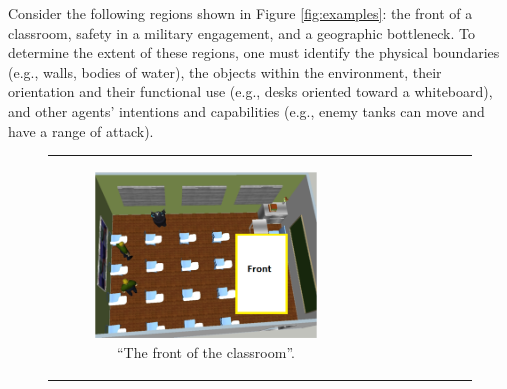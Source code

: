 \documentclass[11pt,letterpaper]{article}
\begin{document}
Consider the following regions shown in Figure \ref{fig:examples}: the front of a classroom, safety in a military engagement, and a geographic bottleneck.  To determine the extent of these regions, one must identify the physical boundaries (e.g., walls, bodies of water), the objects within the environment, their orientation and their functional use (e.g., desks oriented toward a whiteboard), and other agents' intentions and capabilities (e.g., enemy tanks can move and have a range of attack).%

\begin{figure}
\centering
\begin{tabular}{c c c} 
  \begin{subfigure}[b]{0.32\textwidth}
  \includegraphics[width=\textwidth]{figures/classroom-label.png}
  \caption{``The front of the classroom''.}
  \end{subfigure} &
\begin{subfigure}[b]{0.32\textwidth}

\end{subfigure}
\end{tabular}
\end{figure}
\end{document}
